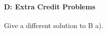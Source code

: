\documentclass[12pt]{article}
\begin{document}
\paragraph{D: Extra Credit Problems}
\begin{itemize}
	{\item Give a different solution to B a).}
\end{itemize}
\end{document}
